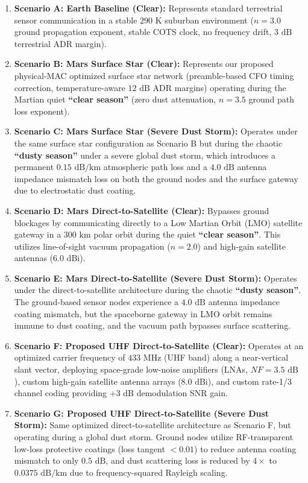 \documentclass[journal,10pt,doublecolumn]{IEEEtran}
\begin{document}
\begin{enumerate}
    \item \textbf{Scenario A: Earth Baseline (Clear):} Represents standard terrestrial sensor communication in a stable $290\text{ K}$ suburban environment ($n = 3.0$ ground propagation exponent, stable COTS clock, no frequency drift, $3\text{ dB}$ terrestrial ADR margin).
    \item \textbf{Scenario B: Mars Surface Star (Clear):} Represents our proposed physical-MAC optimized surface star network (preamble-based CFO timing correction, temperature-aware $12\text{ dB}$ ADR margins) operating during the Martian quiet \textbf{``clear season''} (zero dust attenuation, $n = 3.5$ ground path loss exponent).
    \item \textbf{Scenario C: Mars Surface Star (Severe Dust Storm):} Operates under the same surface star configuration as Scenario B but during the chaotic \textbf{``dusty season''} under a severe global dust storm, which introduces a permanent $0.15\text{ dB/km}$ atmospheric path loss and a $4.0\text{ dB}$ antenna impedance mismatch loss on both the ground nodes and the surface gateway due to electrostatic dust coating.
    \item \textbf{Scenario D: Mars Direct-to-Satellite (Clear):} Bypasses ground blockages by communicating directly to a Low Martian Orbit (LMO) satellite gateway in a $300\text{ km}$ polar orbit during the quiet \textbf{``clear season''}. This utilizes line-of-sight vacuum propagation ($n=2.0$) and high-gain satellite antennas ($6.0\text{ dBi}$).
    \item \textbf{Scenario E: Mars Direct-to-Satellite (Severe Dust Storm):} Operates under the direct-to-satellite architecture during the chaotic \textbf{``dusty season''}. The ground-based sensor nodes experience a $4.0\text{ dB}$ antenna impedance coating mismatch, but the spaceborne gateway in LMO orbit remains immune to dust coating, and the vacuum path bypasses surface scattering.
    \item \textbf{Scenario F: Proposed UHF Direct-to-Satellite (Clear):} Operates at an optimized carrier frequency of $433\text{ MHz}$ (UHF band) along a near-vertical slant vector, deploying space-grade low-noise amplifiers (LNAs, $NF=3.5\text{ dB}$), custom high-gain satellite antenna arrays ($8.0\text{ dBi}$), and custom rate-1/3 channel coding providing $+3\text{ dB}$ demodulation SNR gain.
    \item \textbf{Scenario G: Proposed UHF Direct-to-Satellite (Severe Dust Storm):} Same optimized direct-to-satellite architecture as Scenario F, but operating during a global dust storm. Ground nodes utilize RF-transparent low-loss protective coatings (loss tangent $< 0.01$) to reduce antenna coating mismatch to only $0.5\text{ dB}$, and dust scattering loss is reduced by $4\times$ to $0.0375\text{ dB/km}$ due to frequency-squared Rayleigh scaling.

\end{enumerate}
\end{document}
